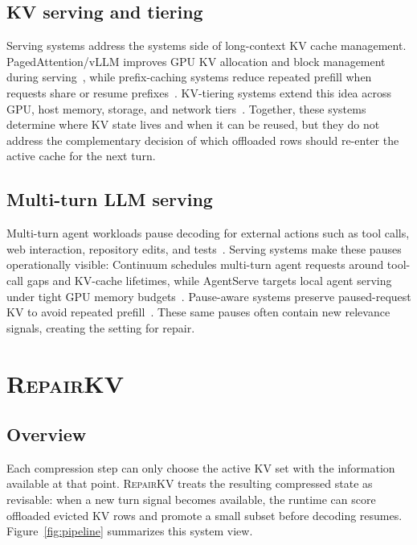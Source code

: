 \documentclass{article}
\newcommand{\repairkv}{\textsc{RepairKV}}
\begin{document}
\subsection{KV serving and tiering}
Serving systems address the systems side of long-context KV cache management.
PagedAttention/vLLM improves GPU KV allocation and block management
during serving~\citep{vllm}, while prefix-caching systems reduce repeated prefill when requests share or resume prefixes~\citep{lmcache,ttkv}. KV-tiering systems extend this idea across GPU, host memory, storage, and network tiers~\citep{lmcache,ttkv,agentserve}. {\color{red}Together, these systems determine where KV state lives and when it can be reused, but they do not address the complementary decision of which offloaded rows should re-enter the active cache for the next turn.}

\subsection{Multi-turn LLM serving}
Multi-turn agent workloads pause decoding for external actions such as tool calls, web interaction, repository edits, and tests~\citep{toollm,webarena,swebench,agentbench}. Serving systems make these pauses operationally visible: Continuum schedules multi-turn agent requests around tool-call gaps and KV-cache lifetimes, while AgentServe targets local agent serving under tight GPU memory budgets~\citep{continuum,agentserve}. Pause-aware systems preserve paused-request KV to avoid repeated prefill~\citep{infercept,continuum,cachedattention}. {\color{red}These same pauses often contain new relevance signals, creating the setting for repair.}

\section{\repairkv{}}
\label{sec:method}

\subsection{Overview}
Each compression step can only choose the active KV set with the information available at that point.
{\color{red}\repairkv{} treats the resulting compressed state as revisable: when a new turn signal becomes available, the runtime can score offloaded evicted KV rows and promote a small subset before decoding resumes.}
Figure~\ref{fig:pipeline} summarizes this system view.
\end{document}
